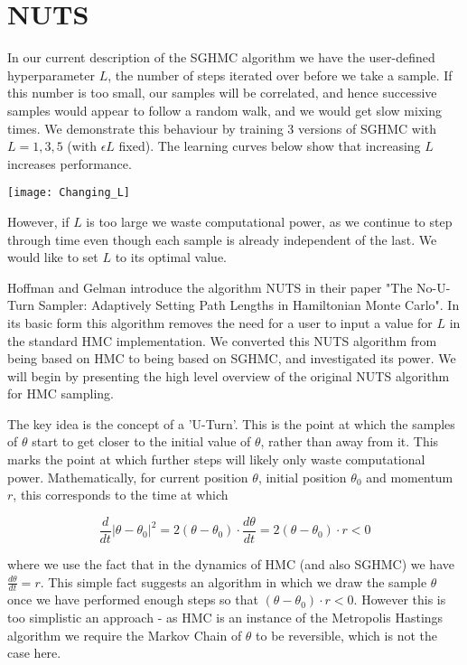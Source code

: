 
\section{NUTS}

In our current description of the SGHMC algorithm we have the user-defined hyperparameter $L$, the number of steps iterated over before we take a sample. If this number is too small, our samples will be correlated, and hence successive samples would appear to follow a random walk, and we would get slow mixing times. We demonstrate this behaviour by training 3 versions of SGHMC with $L=1,3,5$ (with $\epsilon L$ fixed). The learning curves below show that increasing $L$ increases performance.

\texttt{[image: Changing\_L]}

However, if $L$ is too large we waste computational power, as we continue to step through time even though each sample is already independent of the last. We would like to set $L$ to its optimal value.

Hoffman and Gelman introduce the algorithm NUTS in their paper "The No-U-Turn Sampler: Adaptively Setting Path Lengths in Hamiltonian Monte Carlo". In its basic form this algorithm removes the need for a user to input a value for $L$ in the standard HMC implementation. We converted this NUTS algorithm from being based on HMC to being based on SGHMC, and investigated its power. We will begin by presenting the high level overview of the original NUTS algorithm for HMC sampling.

The key idea is the concept of a 'U-Turn'. This is the point at which the samples of $\theta$ start to get closer to the initial value of $\theta$, rather than away from it. This marks the point at which further steps will likely only waste computational power. Mathematically, for current position $\theta$, initial position $\theta_0$ and momentum $r$, this corresponds to the time at which 

$$ \frac{d}{dt} |\theta - \theta_0|^2 = 2(\theta - \theta_0)\cdot\frac{d\theta}{dt} = 2(\theta - \theta_0)\cdot r< 0$$

where we use the fact that in the dynamics of HMC (and also SGHMC) we have $\frac{d\theta}{dt} = r$. This simple fact suggests an algorithm in which we draw the sample $\theta$ once we have performed enough steps so that $(\theta - \theta_0)\cdot r< 0$. However this is too simplistic an approach - as HMC is an instance of the Metropolis Hastings algorithm we require the Markov Chain of $\theta$ to be reversible, which is not the case here.

